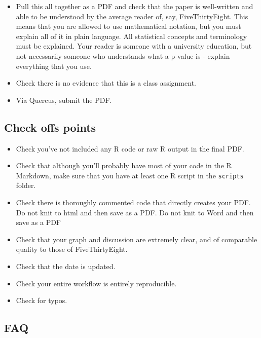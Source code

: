 \documentclass[
]{book}
\providecommand{\tightlist}{%
  \setlength{\itemsep}{0pt}\setlength{\parskip}{0pt}}
\begin{document}
\begin{itemize}
\item
  Pull this all together as a PDF and check that the paper is well-written and able to be understood by the average reader of, say, FiveThirtyEight. This means that you are allowed to use mathematical notation, but you must explain all of it in plain language. All statistical concepts and terminology must be explained. Your reader is someone with a university education, but not necessarily someone who understands what a p-value is - explain everything that you use.
\item
  Check there is no evidence that this is a class assignment.
\item
  Via Quercus, submit the PDF.
\end{itemize}

\hypertarget{check-offs-points}{%
\subsection{Check offs points}\label{check-offs-points}}

\begin{itemize}
\tightlist
\item
  Check you've not included any R code or raw R output in the final PDF.
\item
  Check that although you'll probably have most of your code in the R Markdown, make sure that you have at least one R script in the \texttt{scripts} folder.
\item
  Check there is thoroughly commented code that directly creates your PDF. Do not knit to html and then save as a PDF. Do not knit to Word and then save as a PDF
\item
  Check that your graph and discussion are extremely clear, and of comparable quality to those of FiveThirtyEight.
\item
  Check that the date is updated.
\item
  Check your entire workflow is entirely reproducible.
\item
  Check for typos.
\end{itemize}

\hypertarget{faq}{%
\subsection{FAQ}\label{faq}}
\end{document}
